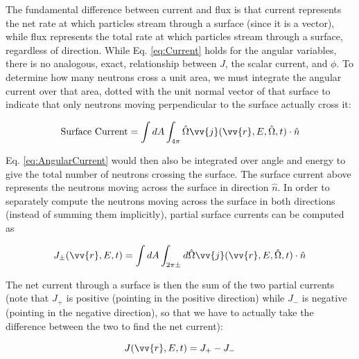 \documentclass[10pt]{article}
\newcommand{\beq}{\begin{equation}}
\newcommand{\eeq}{\end{equation}}
\newcommand{\hO}{\hat{\Omega}}
\newcommand{\spa}{(\vv{r}, E, \hO, t)}
\newcommand{\spas}{(\vv{r},E,t)}
\newcommand{\spap}{(\vv{r}, E', \hO',t)}
\begin{document}
\begin{flushleft}
The fundamental difference between current and flux is that current represents the net rate at which particles stream through a surface (since it is a vector), while flux represents the total rate at which particles stream through a surface, regardless of direction. While Eq. \ref{eq:Current} holds for the angular variables, there is no analogous, exact, relationship between \(J\), the scalar current, and \(\phi\). To determine how many neutrons cross a unit area, we must integrate the angular current over that area, dotted with the unit normal vector of that surface to indicate that only neutrons moving perpendicular to the surface actually cross it:

\beq
\label{eq:AngularCurrent}
\textrm{Surface Current} = \int dA \int_{4\pi}^{}\hO\vv{j}\spa \cdot\hat{n}
\eeq

Eq. \ref{eq:AngularCurrent} would then also be integrated over angle and energy to give the total number of neutrons crossing the surface. The surface current above represents the neutrons moving across the surface in direction \(\hat{n}\). In order to separately compute the neutrons moving across the surface in both directions (instead of summing them implicitly), partial surface currents can be computed as

\beq
\label{eq:PartialCurrent}
J_\pm \spas = \int dA\int_{2\pi\pm}^{} d\hO   \vv{j}\spa \cdot\hat{n}
\eeq

The net current through a surface is then the sum of the two partial currents (note that \(J_+\) is positive (pointing in the positive direction) while \(J_-\) is negative (pointing in the negative direction), so that we have to actually take the difference between the two to find the net current):

\beq
\label{eq:TotalCurrent}
J \spas = J_+ - J_-
\eeq

\clearpage

\end{flushleft}
\end{document}
